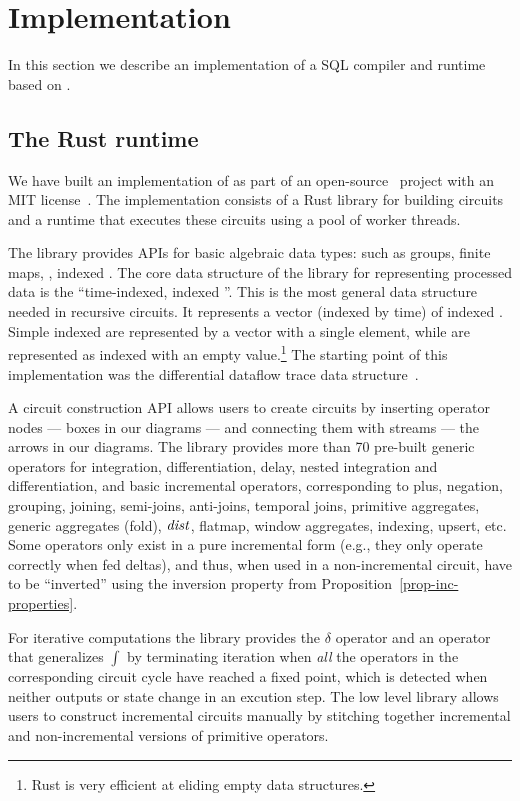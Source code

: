 \section{Implementation}\label{sec:implementation}

In this section we describe an implementation of a SQL compiler and
runtime based on \dbsp.

\subsection{The \dbsp Rust runtime}\label{sec:runtime}

We have built an implementation of \dbsp as part of an
open-source~\cite{dbsp-repo} project with an MIT
license~\cite{dbsp-crate}.  The implementation consists of a Rust
library for building circuits and a runtime that executes these
circuits using a pool of worker threads.

The library provides APIs for basic algebraic data types: such as
groups, finite maps, \zrs, indexed \zrs.  The core data structure of
the library for representing processed data is the ``time-indexed,
indexed \zr''.  This is the most general data structure needed in
recursive circuits.  It represents a vector (indexed by time) of
indexed \zrs.  Simple indexed \zrs are represented by a vector with a
single element, while \zrs are represented as indexed \zrs with an
empty value.\footnote{Rust is very efficient at eliding empty data
structures.}  The starting point of this implementation was the
differential dataflow trace data structure~\cite{dd-crate}.

A circuit construction API allows users to create \dbsp circuits by
inserting operator nodes --- boxes in our diagrams --- and connecting
them with streams --- the arrows in our diagrams.  The library
provides more than 70 pre-built generic operators for integration,
differentiation, delay, nested integration and differentiation, and
basic \zr incremental operators, corresponding to plus, negation,
grouping, joining, semi-joins, anti-joins, temporal joins, primitive
aggregates, generic aggregates (fold), $\mathit{dist}$, flatmap, window
aggregates, indexing, upsert, etc.  Some operators only exist in a
pure incremental form (e.g., they only operate correctly when fed
deltas), and thus, when used in a non-incremental circuit, have to be
``inverted'' using the inversion property from
Proposition~\ref{prop-inc-properties}.

For iterative computations the library provides the $\delta$ operator
and an operator that generalizes $\int$ by terminating iteration when
\emph{all} the operators in the corresponding circuit cycle have
reached a fixed point, which is detected when neither outputs or state
change in an excution step.  The low level library allows users to
construct incremental circuits manually by stitching together
incremental and non-incremental versions of primitive operators.

